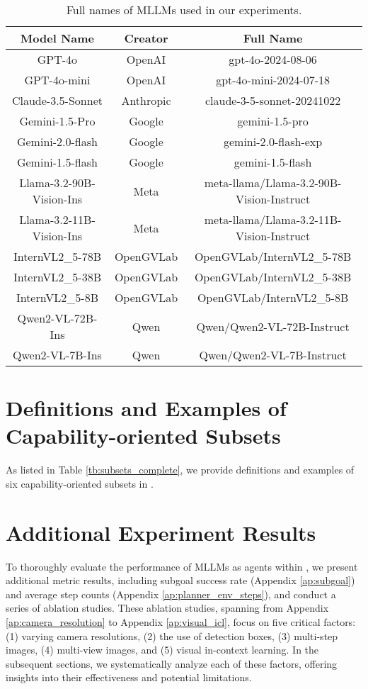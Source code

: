 \begin{table}[h]
    \centering
    \begin{tabular}{c|cc}
    \toprule
        Model Name  & Creator & Full Name  \\
         \midrule
       GPT-4o   & OpenAI &  gpt-4o-2024-08-06 \\
       GPT-4o-mini & OpenAI & gpt-4o-mini-2024-07-18 \\
       Claude-3.5-Sonnet & Anthropic & claude-3-5-sonnet-20241022 \\
       Gemini-1.5-Pro & Google  & gemini-1.5-pro \\
       Gemini-2.0-flash  & Google & gemini-2.0-flash-exp \\
       Gemini-1.5-flash  & Google & gemini-1.5-flash \\
       Llama-3.2-90B-Vision-Ins & Meta & meta-llama/Llama-3.2-90B-Vision-Instruct \\
       Llama-3.2-11B-Vision-Ins & Meta & meta-llama/Llama-3.2-11B-Vision-Instruct \\
       InternVL2\_5-78B & OpenGVLab & OpenGVLab/InternVL2\_5-78B \\
       InternVL2\_5-38B  & OpenGVLab  & OpenGVLab/InternVL2\_5-38B \\
       InternVL2\_5-8B  & OpenGVLab & OpenGVLab/InternVL2\_5-8B \\
       Qwen2-VL-72B-Ins & Qwen & Qwen/Qwen2-VL-72B-Instruct \\
       Qwen2-VL-7B-Ins & Qwen & Qwen/Qwen2-VL-7B-Instruct \\
         \bottomrule
    \end{tabular}
    \caption{Full names of MLLMs used in our experiments.}
    \label{tab:model_versions}
\end{table}


\section{Definitions and Examples of Capability-oriented Subsets}
\label{ap:task_subset}
As listed in Table \ref{tb:subsets_complete}, we provide definitions and examples of six capability-oriented subsets in \name. 







\clearpage
\section{Additional Experiment Results} \label{ap:additional_exp}
To thoroughly evaluate the performance of MLLMs as agents within \name, we present additional metric results, including subgoal success rate (Appendix \ref{ap:subgoal}) and average step counts (Appendix \ref{ap:planner_env_steps}), and conduct a series of ablation studies. These ablation studies, spanning from Appendix \ref{ap:camera_resolution} to Appendix \ref{ap:visual_icl}, focus on five critical factors: (1) varying camera resolutions, (2) the use of detection boxes, (3) multi-step images, (4) multi-view images, and (5) visual in-context learning. In the subsequent sections, we systematically analyze each of these factors, offering insights into their effectiveness and potential limitations.


